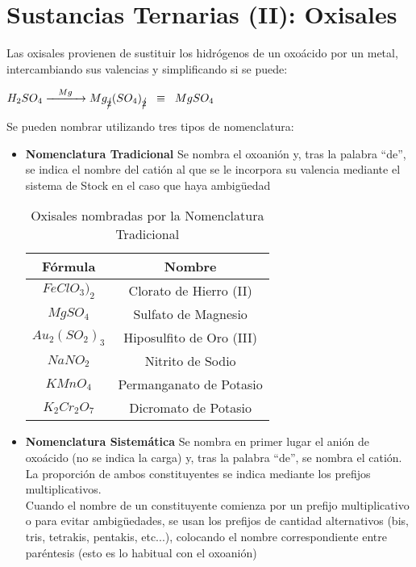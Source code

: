 \documentclass[11pt,fleqn]{book} %
\begin{document}
\section{Sustancias Ternarias (II): Oxisales}
Las oxisales provienen de sustituir los hidrógenos de un oxoácido por un metal, intercambiando sus valencias y simplificando si se puede:
\begin{center}
	$H_2SO_4  \xrightarrow{\hspace{0,3cm}Mg\hspace{0,3cm}} Mg_{\cancel{2}}(SO_4)_{\cancel{2}} \hspace{0,2cm}\equiv\hspace{0,2cm} MgSO_4$
\end{center}
Se pueden nombrar utilizando tres tipos de nomenclatura:\\
\begin{itemize}
	\item \textbf{Nomenclatura Tradicional} Se nombra el oxoanión y, tras la palabra “de”, se indica el nombre del catión al que se le incorpora su valencia mediante el sistema de Stock en el caso que haya ambigüedad
	\begin{table}[h!]
		\centering
		\begin{tabular}{c|c}
			Fórmula&Nombre\\ \hline
			$FeClO_3)_2$&Clorato de Hierro (II)\\
			$MgSO_4$&Sulfato de Magnesio\\
			$Au_2(SO_2)_3$&Hiposulfito de Oro (III)\\
			$NaNO_2$&Nitrito de Sodio\\
			$KMnO_4$&Permanganato de Potasio\\
			$K_2Cr_2O_7$&Dicromato de Potasio\\ \hline
		\end{tabular}
			\caption{Oxisales nombradas por la Nomenclatura Tradicional}
	\end{table}
	\item\textbf{Nomenclatura Sistemática} Se nombra en primer lugar el anión de oxoácido (no se indica la carga) y, tras la palabra “de”, se nombra el catión. La proporción de ambos constituyentes se indica mediante los prefijos multiplicativos.\\ 
	Cuando el nombre de un constituyente comienza por un prefijo multiplicativo o para evitar ambigüedades, se usan los prefijos de cantidad alternativos (bis, tris, tetrakis, pentakis, etc...), colocando el nombre correspondiente entre paréntesis (esto es lo habitual con el oxoanión)\\

\end{itemize}
\end{document}
